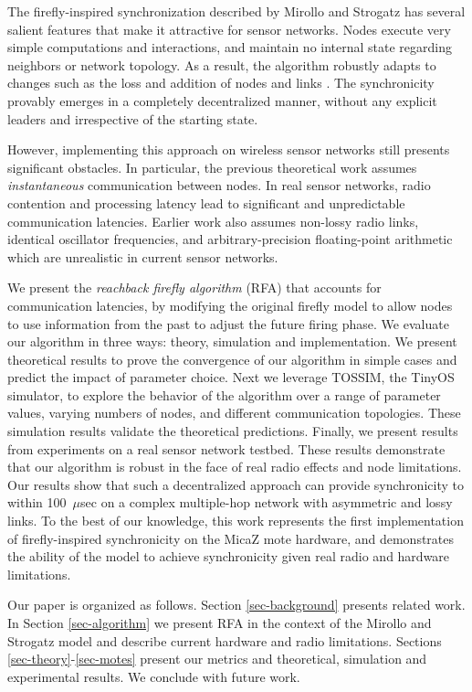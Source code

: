 \documentclass{sig-alternate}
\begin{document}
The firefly-inspired synchronization described by Mirollo and Strogatz
has several salient features that make it attractive for sensor
networks. Nodes execute very simple computations and interactions, and
maintain no internal state regarding neighbors or network topology. As
a result, the algorithm robustly adapts to changes such as the loss
and addition of nodes and links \cite{lucarelli04}. The synchronicity
provably emerges in a completely decentralized manner, without any
explicit leaders and irrespective of the starting state.

However, implementing this approach on wireless sensor networks still
presents significant obstacles. In particular, the previous
theoretical work assumes {\em instantaneous} communication between
nodes.  In real sensor networks, radio contention and processing
latency lead to significant and unpredictable communication
latencies. Earlier work also assumes non-lossy radio links, identical
oscillator frequencies, and arbitrary-precision floating-point
arithmetic which are unrealistic in current sensor networks.

We present the {\em reachback firefly algorithm} (RFA) that accounts for
communication latencies, by modifying the original firefly model to
allow nodes to use information from the past to adjust the future
firing phase. We evaluate our algorithm in three ways: theory,
simulation and implementation. We present theoretical results to prove
the convergence of our algorithm in simple cases and predict the
impact of parameter choice. Next we leverage TOSSIM, the TinyOS
simulator, to explore the behavior of the algorithm over a range of
parameter values, varying numbers of nodes, and different
communication topologies. These simulation results validate the
theoretical predictions. Finally, we present results from experiments
on a real sensor network testbed. These results demonstrate that our
algorithm is robust in the face of real radio effects and node
limitations.  Our results show that such a decentralized approach can
provide synchronicity to within 100~$\mu$sec on a complex multiple-hop
network with asymmetric and lossy links. To the best of our knowledge,
this work represents the first implementation of firefly-inspired
synchronicity on the MicaZ mote hardware, and demonstrates the ability
of the model to achieve synchronicity given real radio and hardware
limitations.

Our paper is organized as follows. Section \ref{sec-background}
presents related work. In Section \ref{sec-algorithm} we present RFA
in the context of the Mirollo and Strogatz model and describe current
hardware and radio limitations. Sections
\ref{sec-theory}-\ref{sec-motes} present our metrics and theoretical,
simulation and experimental results. We conclude with future work.
\end{document}
